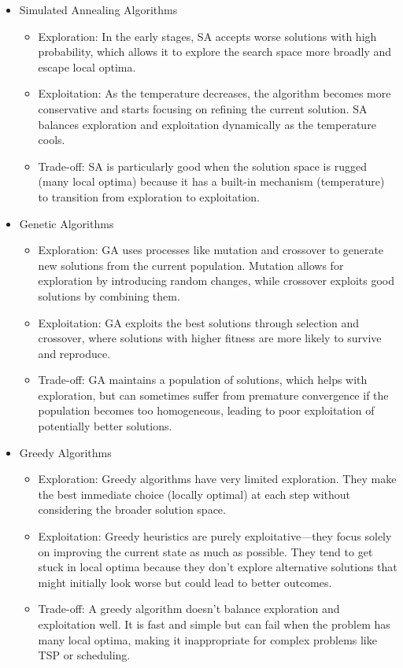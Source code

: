 \documentclass[
  letterpaper,
  DIV=11,
  numbers=noendperiod]{scrreprt}
\providecommand{\tightlist}{%
  \setlength{\itemsep}{0pt}\setlength{\parskip}{0pt}}\usepackage{longtable,booktabs,array}
\begin{document}
\begin{itemize}
\tightlist
\item
  Simulated Annealing Algorithms

  \begin{itemize}
  \tightlist
  \item
    Exploration: In the early stages, SA accepts worse solutions with
    high probability, which allows it to explore the search space more
    broadly and escape local optima.
  \item
    Exploitation: As the temperature decreases, the algorithm becomes
    more conservative and starts focusing on refining the current
    solution. SA balances exploration and exploitation dynamically as
    the temperature cools.
  \item
    Trade-off: SA is particularly good when the solution space is rugged
    (many local optima) because it has a built-in mechanism
    (temperature) to transition from exploration to exploitation.
  \end{itemize}
\item
  Genetic Algorithms

  \begin{itemize}
  \tightlist
  \item
    Exploration: GA uses processes like mutation and crossover to
    generate new solutions from the current population. Mutation allows
    for exploration by introducing random changes, while crossover
    exploits good solutions by combining them.
  \item
    Exploitation: GA exploits the best solutions through selection and
    crossover, where solutions with higher fitness are more likely to
    survive and reproduce.
  \item
    Trade-off: GA maintains a population of solutions, which helps with
    exploration, but can sometimes suffer from premature convergence if
    the population becomes too homogeneous, leading to poor exploitation
    of potentially better solutions.
  \end{itemize}
\item
  Greedy Algorithms

  \begin{itemize}
  \tightlist
  \item
    Exploration: Greedy algorithms have very limited exploration. They
    make the best immediate choice (locally optimal) at each step
    without considering the broader solution space.
  \item
    Exploitation: Greedy heuristics are purely exploitative---they focus
    solely on improving the current state as much as possible. They tend
    to get stuck in local optima because they don't explore alternative
    solutions that might initially look worse but could lead to better
    outcomes.
  \item
    Trade-off: A greedy algorithm doesn't balance exploration and
    exploitation well. It is fast and simple but can fail when the
    problem has many local optima, making it inappropriate for complex
    problems like TSP or scheduling.
  \end{itemize}
\end{itemize}
\end{document}
